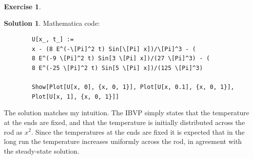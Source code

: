 \documentclass{article}
\theoremstyle{definition}
\newtheorem*{exer*}{Exercise}
\newtheorem*{sln*}{Solution}
\begin{document}
\begin{exer*}
\begin{sln*}
		\noindent Mathematica code:
		\begin{lstlisting}
		U[x_, t_] := 
		x - (8 E^(-\[Pi]^2 t) Sin[\[Pi] x])/\[Pi]^3 - (
		8 E^(-9 \[Pi]^2 t) Sin[3 \[Pi] x])/(27 \[Pi]^3) - (
		8 E^(-25 \[Pi]^2 t) Sin[5 \[Pi] x])/(125 \[Pi]^3)
		
		Show[Plot[U[x, 0], {x, 0, 1}], Plot[U[x, 0.1], {x, 0, 1}], 
		Plot[U[x, 1], {x, 0, 1}]]
		\end{lstlisting}
		
		The solution matches my intuition. The IBVP simply states that the temperature at the ends are fixed, and that the temperature is initially distributed across the rod as $x^2$. Since the temperatures at the ends are fixed it is expected that in the long run the temperature increases uniformly across the rod, in agreement with the steady-state solution. 
		
	\end{sln*}
\end{exer*}
\newpage
\end{document}
